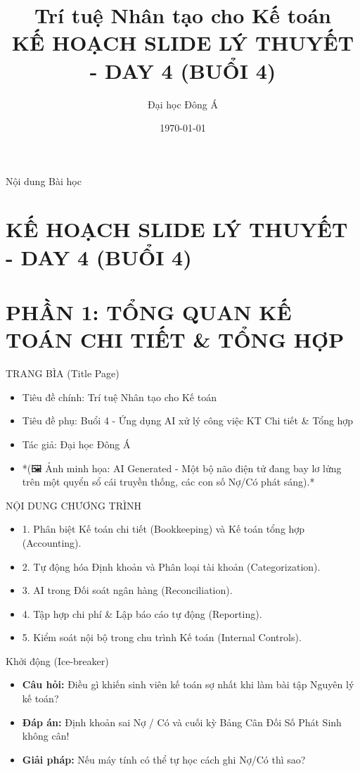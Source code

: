 \documentclass[aspectratio=169]{beamer}
\title[Trí tuệ Nhân tạo cho Kế toán]{Trí tuệ Nhân tạo cho Kế toán \\ \vspace{0.3cm} \Large KẾ HOẠCH SLIDE LÝ THUYẾT - DAY 4 (BUỔI 4)}
\author{Đại học Đông Á}
\date{\today}
\begin{document}
\begin{frame}
    \titlepage
\end{frame}

\begin{frame}{Nội dung Bài học}
    \tableofcontents
\end{frame}


\section{KẾ HOẠCH SLIDE LÝ THUYẾT - DAY 4 (BUỔI 4)}


\section{PHẦN 1: TỔNG QUAN KẾ TOÁN CHI TIẾT \& TỔNG HỢP}


\begin{frame}{TRANG BÌA (Title Page)}
    \begin{itemize}
        \item Tiêu đề chính: Trí tuệ Nhân tạo cho Kế toán
        \item Tiêu đề phụ: Buổi 4 - Ứng dụng AI xử lý công việc KT Chi tiết \& Tổng hợp
        \item Tác giả: Đại học Đông Á
        \item *(🖼️ Ảnh minh họa: AI Generated - Một bộ não điện tử đang bay lơ lửng trên một quyển sổ cái truyền thống, các con số Nợ/Có phát sáng).*
    \end{itemize}
\end{frame}


\begin{frame}{NỘI DUNG CHƯƠNG TRÌNH}
    \begin{itemize}
        \item 1. Phân biệt Kế toán chi tiết (Bookkeeping) và Kế toán tổng hợp (Accounting).
        \item 2. Tự động hóa Định khoản và Phân loại tài khoản (Categorization).
        \item 3. AI trong Đối soát ngân hàng (Reconciliation).
        \item 4. Tập hợp chi phí \& Lập báo cáo tự động (Reporting).
        \item 5. Kiểm soát nội bộ trong chu trình Kế toán (Internal Controls).
    \end{itemize}
\end{frame}


\begin{frame}{Khởi động (Ice-breaker)}
    \begin{itemize}
        \item \textbf{Câu hỏi:} Điều gì khiến sinh viên kế toán sợ nhất khi làm bài tập Nguyên lý kế toán?
        \item \textbf{Đáp án:} Định khoản sai Nợ / Có và cuối kỳ Bảng Cân Đối Số Phát Sinh không cân!
        \item \textbf{Giải pháp:} Nếu máy tính có thể tự học cách ghi Nợ/Có thì sao?
    \end{itemize}
\end{frame}
\end{document}
